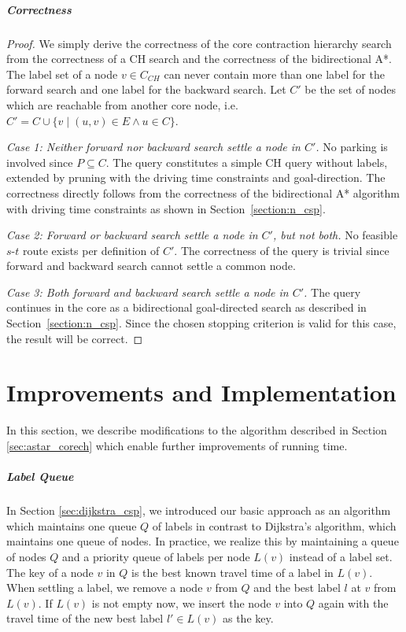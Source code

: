 \subparagraph{Correctness}
\begin{proof}
	We simply derive the correctness of the core contraction hierarchy search from the correctness of a CH search and the correctness of the bidirectional A*. The label set of a node $v \in C_{CH}$ can never contain more than one label for the forward search and one label for the backward search. Let $C'$ be the set of nodes which are reachable from another core node, i.e. $C' = C \cup \{v \mid (u,v) \in E \wedge u \in C\}$.

	\emph{Case 1: Neither forward nor backward search settle a node in $C'$.} No parking is involved since $P \subseteq C$. The query constitutes a simple CH query without labels, extended by pruning with the driving time constraints and goal-direction. The correctness directly follows from the correctness of the bidirectional A* algorithm with driving time constraints as shown in Section~\ref{section:n_csp}.

	\emph{Case 2: Forward or backward search settle a node in $C'$, but not both.} No feasible $s$-$t$ route exists per definition of $C'$. The correctness of the query is trivial since forward and backward search cannot settle a common node.

	\emph{Case 3: Both forward and backward search settle a node in $C'$.} The query continues in the core as a bidirectional goal-directed search as described in Section~\ref{section:n_csp}. Since the chosen stopping criterion is valid for this case, the result will be correct.
\end{proof}

\section{Improvements and Implementation\label{section:impl}}
In this section, we describe modifications to the algorithm described in Section \ref{sec:astar_corech} which enable further improvements of running time.

\subparagraph{Label Queue}
In Section \ref{sec:dijkstra_csp}, we introduced our basic approach as an algorithm which maintains one queue $Q$ of labels in contrast to Dijkstra's algorithm, which maintains one queue of nodes. In practice, we realize this by maintaining a queue of nodes $Q$ and a priority queue of labels per node $L(v)$ instead of a label set. The key of a node $v$ in $Q$ is the best known travel time of a label in $L(v)$. When settling a label, we remove a node $v$ from $Q$ and the best label $l$ at $v$ from $L(v)$. If $L(v)$ is not empty now, we insert the node $v$ into $Q$ again with the travel time of the new best label $l' \in L(v)$ as the key.

